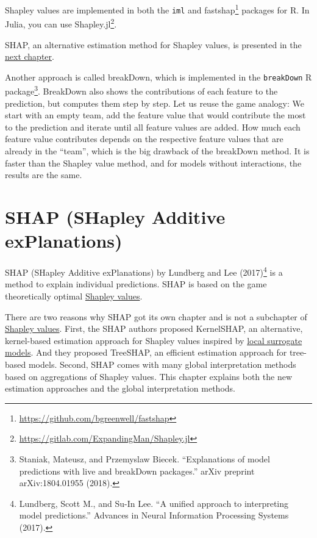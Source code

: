 \documentclass[
  11pt,
]{scrbook}
\renewcommand{\href}[2]{#2\footnote{\url{#1}}}
\begin{document}
Shapley values are implemented in both the \texttt{iml} and \href{https://github.com/bgreenwell/fastshap}{fastshap} packages for R.
In Julia, you can use \href{https://gitlab.com/ExpandingMan/Shapley.jl}{Shapley.jl}.

SHAP, an alternative estimation method for Shapley values, is presented in the \protect\hyperlink{shap}{next chapter}.

Another approach is called breakDown, which is implemented in the \texttt{breakDown} R package\footnote{Staniak, Mateusz, and Przemyslaw Biecek. ``Explanations of model predictions with live and breakDown packages.'' arXiv preprint arXiv:1804.01955 (2018).}.
BreakDown also shows the contributions of each feature to the prediction, but computes them step by step.
Let us reuse the game analogy:
We start with an empty team, add the feature value that would contribute the most to the prediction and iterate until all feature values are added.
How much each feature value contributes depends on the respective feature values that are already in the ``team'', which is the big drawback of the breakDown method.
It is faster than the Shapley value method, and for models without interactions, the results are the same.

\newpage

\hypertarget{shap}{%
\section{SHAP (SHapley Additive exPlanations)}\label{shap}}

SHAP (SHapley Additive exPlanations) by Lundberg and Lee (2017)\footnote{Lundberg, Scott M., and Su-In Lee. ``A unified approach to interpreting model predictions.'' Advances in Neural Information Processing Systems (2017).} is a method to explain individual predictions.
SHAP is based on the game theoretically optimal \protect\hyperlink{shapley}{Shapley values}.

There are two reasons why SHAP got its own chapter and is not a subchapter of \protect\hyperlink{shapley}{Shapley values}.
First, the SHAP authors proposed KernelSHAP, an alternative, kernel-based estimation approach for Shapley values inspired by \protect\hyperlink{lime}{local surrogate models}.
And they proposed TreeSHAP, an efficient estimation approach for tree-based models.
Second, SHAP comes with many global interpretation methods based on aggregations of Shapley values.
This chapter explains both the new estimation approaches and the global interpretation methods.
\end{document}
